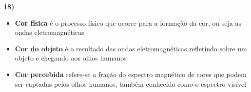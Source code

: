 \textbf{18)} 

\begin{itemize}
	\item \textbf{Cor física} é o processo físico que ocorre para a 
	formação da cor, ou seja as ondas eletromagnéticas
	
	\item \textbf{Cor do objeto} é o resultado das ondas eletromagnéticas 
	refletindo sobre um objeto e chegando aos olhos humanos
	
	\item \textbf{Cor percebida} refere-se a fração do espectro magnético de
	cores que podem ser captadas pelos olhos humanos, também conhecido como 
	o espectro visível
\end{itemize}